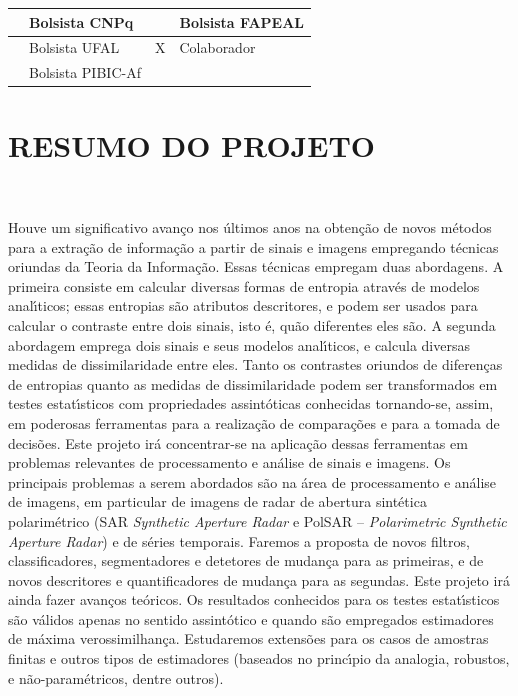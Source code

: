 \documentclass[12pt]{article}
\begin{document}
\begin{table}[!h]
\begin{center}
\begin{tabularx}{\textwidth}{|X|X|X|X|}
\hline                              
& Bolsista CNPq &  &Bolsista FAPEAL\\
\hline             
& Bolsista UFAL & X &Colaborador\\
\hline             
& Bolsista PIBIC-Af&  &\\
\hline     
\end{tabularx}
\end{center}
\end{table}

\hrulefill   


\newpage
\section*{\centering \textbf{RESUMO DO PROJETO}}
\hrulefill \\

\vspace{0.2cm}

Houve um significativo avanço nos últimos anos na obtenção de novos métodos para a extração de informação a partir de sinais e imagens empregando técnicas oriundas da Teoria da Informação. Essas técnicas empregam duas abordagens. A primeira consiste em calcular diversas formas de entropia através de modelos analı́ticos; essas entropias são atributos descritores, e podem ser usados para calcular o contraste entre dois sinais, isto é, quão diferentes eles são. A segunda abordagem emprega dois sinais e seus modelos analı́ticos, e calcula diversas medidas de dissimilaridade entre eles. Tanto os contrastes oriundos de diferenças de entropias quanto as medidas de dissimilaridade podem ser transformados em testes estatı́sticos com propriedades assintóticas conhecidas tornando-se, assim, em poderosas ferramentas para a realização de comparações e para a tomada de decisões. Este projeto irá concentrar-se na aplicação dessas ferramentas em problemas relevantes de processamento e análise de sinais e imagens. Os principais
problemas a serem abordados são na área de processamento e análise de imagens, em particular de imagens de radar de abertura sintética polarimétrico (SAR \textit{Synthetic Aperture Radar} e PolSAR -- \textit{Polarimetric Synthetic Aperture Radar}) e de séries temporais. Faremos a proposta de novos filtros, classificadores, segmentadores e detetores de mudança para as primeiras, e de novos descritores e quantificadores de mudança para as segundas. Este projeto irá ainda fazer avanços teóricos. Os resultados conhecidos para os testes estatı́sticos são válidos apenas no sentido assintótico e quando são empregados estimadores de máxima verossimilhança. Estudaremos extensões para os casos de amostras finitas e outros tipos de estimadores (baseados no princı́pio da analogia, robustos, e não-paramétricos, dentre outros).
\end{document}
